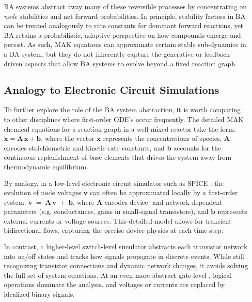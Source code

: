 \documentclass[entropy,article,submit,pdftex,moreauthors]{Definitions/mdpi}
\begin{document}
BA systems abstract away many of these reversible processes by concentrating on \emph{node} stabilities and net forward probabilities. In principle, stability factors in BA can be treated analogously to rate constants for dominant forward reactions, yet BA retains a probabilistic, adaptive perspective on how compounds emerge and persist. As such, MAK equations can approximate certain stable sub-dynamics in a BA system, but they do not inherently capture the generative or feedback-driven aspects that allow BA systems to evolve beyond a fixed reaction graph. 


\subsection{Analogy to Electronic Circuit Simulations}
\label{subsec:spice-analogy}

To further explore the role of the BA system abstraction, it is worth comparing to other disciplines where first-order ODE's occur frequently. The detailed MAK chemical equations for a reaction graph in a well-mixed reactor take the form:
${\dot{\mathbf{x}}} = \mathbf{A}\,\mathbf{x} + \mathbf{b}$, where the vector \(\mathbf{x}\) represents the concentrations of species, 
\(\mathbf{A}\) encodes stoichiometric and kinetic-rate constants, and 
\(\mathbf{b}\) accounts for the continuous replenishment of base elements 
that drives the system away from thermodynamic equilibrium.

By analogy, in a low-level electronic circuit simulator such as SPICE \cite{SpiceRef}, the evolution of node voltages $\mathbf{v}$ can often be approximated locally by a first-order system:
$\dot{\mathbf{v}} \;=\; \mathbf{A}\,\mathbf{v} \;+\; \mathbf{b}$,
where $\mathbf{A}$ encodes device- and network-dependent parameters (e.g. conductances, gains in small-signal transistors), and $\mathbf{b}$ represents external currents or voltage sources. This detailed model allows for transient bidirectional flows, capturing the precise device physics at each time step.

In contrast, a higher-level switch-level simulator \cite{AdlerCAD} abstracts each transistor network into on/off states and tracks how signals propagate in discrete events. While still recognizing transistor connections and dynamic network changes, it avoids solving the full set of system equations. At an even more abstract gate-level \cite{FeynmanComp}, logical operations dominate the analysis, and voltages or currents are replaced by idealized binary signals.
\end{document}
